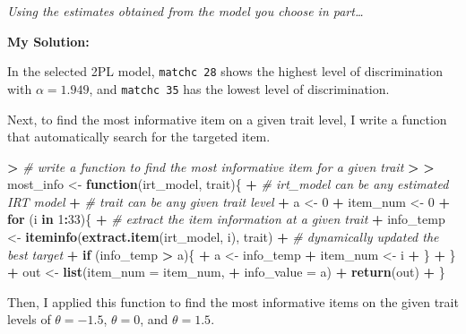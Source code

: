 \documentclass[
]{article}
\newenvironment{Shaded}{\begin{snugshade}}{\end{snugshade}}
\newcommand{\AttributeTok}[1]{\textcolor[rgb]{0.13,0.29,0.53}{#1}}
\newcommand{\CommentTok}[1]{\textcolor[rgb]{0.56,0.35,0.01}{\textit{#1}}}
\newcommand{\ControlFlowTok}[1]{\textcolor[rgb]{0.13,0.29,0.53}{\textbf{#1}}}
\newcommand{\DecValTok}[1]{\textcolor[rgb]{0.00,0.00,0.81}{#1}}
\newcommand{\ErrorTok}[1]{\textcolor[rgb]{0.64,0.00,0.00}{\textbf{#1}}}
\newcommand{\FunctionTok}[1]{\textcolor[rgb]{0.13,0.29,0.53}{\textbf{#1}}}
\newcommand{\NormalTok}[1]{#1}
\newcommand{\OtherTok}[1]{\textcolor[rgb]{0.56,0.35,0.01}{#1}}
\newcommand{\SpecialCharTok}[1]{\textcolor[rgb]{0.81,0.36,0.00}{\textbf{#1}}}
\begin{document}
\emph{Using the estimates obtained from the model you choose in
part\ldots{}}

\textbf{My Solution:}

In the selected 2PL model, \texttt{matchc\ 28} shows the highest level
of discrimination with \(\alpha = 1.949\), and \texttt{matchc\ 35} has
the lowest level of discrimination.

Next, to find the most informative item on a given trait level, I write
a function that automatically search for the targeted item.

\begin{Shaded}
\begin{Highlighting}[]
\SpecialCharTok{\textgreater{}} \CommentTok{\# write a function to find the most informative item for a given trait}
\ErrorTok{\textgreater{}} 
\ErrorTok{\textgreater{}}\NormalTok{ most\_info }\OtherTok{\textless{}{-}} \ControlFlowTok{function}\NormalTok{(irt\_model, trait)\{}
\SpecialCharTok{+}   \CommentTok{\# irt\_model can be any estimated IRT model}
\SpecialCharTok{+}   \CommentTok{\# trait can be any given trait level}
\SpecialCharTok{+}\NormalTok{   a }\OtherTok{\textless{}{-}} \DecValTok{0}
\SpecialCharTok{+}\NormalTok{   item\_num }\OtherTok{\textless{}{-}} \DecValTok{0}
\SpecialCharTok{+}   \ControlFlowTok{for}\NormalTok{ (i }\ControlFlowTok{in} \DecValTok{1}\SpecialCharTok{:}\DecValTok{33}\NormalTok{)\{}
\SpecialCharTok{+}     \CommentTok{\# extract the item information at a given trait}
\SpecialCharTok{+}\NormalTok{     info\_temp }\OtherTok{\textless{}{-}} \FunctionTok{iteminfo}\NormalTok{(}\FunctionTok{extract.item}\NormalTok{(irt\_model, i), trait)}
\SpecialCharTok{+}     \CommentTok{\# dynamically updated the best target}
\SpecialCharTok{+}     \ControlFlowTok{if}\NormalTok{ (info\_temp }\SpecialCharTok{\textgreater{}}\NormalTok{ a)\{}
\SpecialCharTok{+}\NormalTok{       a }\OtherTok{\textless{}{-}}\NormalTok{ info\_temp}
\SpecialCharTok{+}\NormalTok{       item\_num }\OtherTok{\textless{}{-}}\NormalTok{ i}
\SpecialCharTok{+}\NormalTok{     \}}
\SpecialCharTok{+}\NormalTok{   \}}
\SpecialCharTok{+}\NormalTok{   out }\OtherTok{\textless{}{-}} \FunctionTok{list}\NormalTok{(}\AttributeTok{item\_num =}\NormalTok{ item\_num, }
\SpecialCharTok{+}               \AttributeTok{info\_value =}\NormalTok{ a)}
\SpecialCharTok{+}   \FunctionTok{return}\NormalTok{(out)}
\SpecialCharTok{+}\NormalTok{ \}}
\end{Highlighting}
\end{Shaded}

Then, I applied this function to find the most informative items on the
given trait levels of \(\theta = -1.5\), \(\theta = 0\), and
\(\theta = 1.5\).
\end{document}
